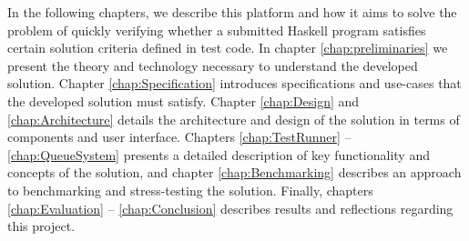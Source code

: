In the following chapters, we describe this platform and how it aims to solve the problem of quickly verifying whether a submitted Haskell program satisfies certain solution criteria defined in test code. 
In chapter \ref{chap:preliminaries} we present the theory and technology necessary to understand the developed solution. 
Chapter \ref{chap:Specification} introduces specifications and use-cases that the developed solution must satisfy. 
Chapter \ref{chap:Design} and \ref{chap:Architecture} details the architecture and design of the solution in terms of components and user interface.
Chapters \ref{chap:TestRunner} -- \ref{chap:QueueSystem} presents a detailed description of key functionality and concepts of the solution, and chapter \ref{chap:Benchmarking} describes an approach to benchmarking and stress-testing the solution. 
Finally, chapters \ref{chap:Evaluation} -- \ref{chap:Conclusion} describes results and reflections regarding this project.


